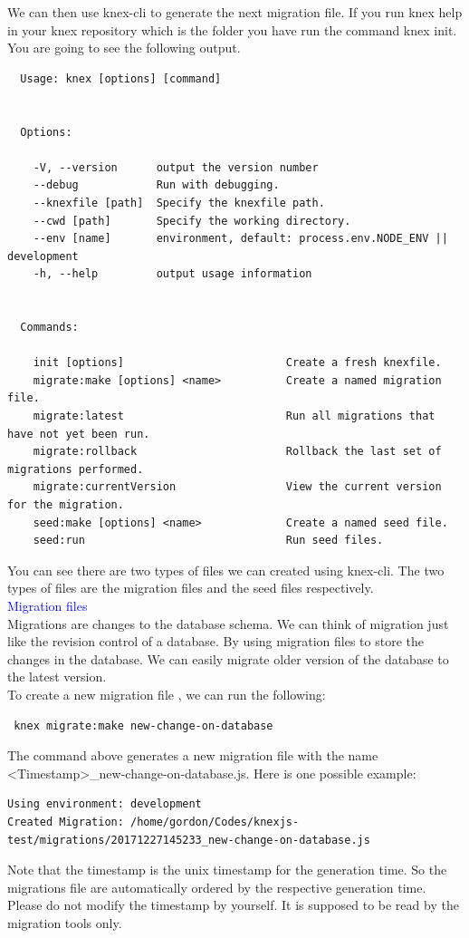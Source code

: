 \documentclass[a4paper]{article}
\begin{document}
We can then use knex-cli to generate the next migration file. If you run knex help in your knex repository which is the folder you have run the command knex init. You are going to see the following output.
\begin{lstlisting}
  Usage: knex [options] [command]


  Options:

    -V, --version      output the version number
    --debug            Run with debugging.
    --knexfile [path]  Specify the knexfile path.
    --cwd [path]       Specify the working directory.
    --env [name]       environment, default: process.env.NODE_ENV || development
    -h, --help         output usage information


  Commands:

    init [options]                         Create a fresh knexfile.
    migrate:make [options] <name>          Create a named migration file.
    migrate:latest                         Run all migrations that have not yet been run.
    migrate:rollback                       Rollback the last set of migrations performed.
    migrate:currentVersion                 View the current version for the migration.
    seed:make [options] <name>             Create a named seed file.
    seed:run                               Run seed files.
\end{lstlisting}

You can see there are two types of files we can created using knex-cli. The two types of files are the migration files and the seed files respectively.\\

\textcolor{blue}{Migration files}\\

Migrations are changes to the database schema. We can think of migration just like the revision control of a database. By using migration files to store the changes in the database. We can easily migrate older version of the database to the latest version.\\

To create a new migration file , we can run the following:
\begin{lstlisting}
 knex migrate:make new-change-on-database
\end{lstlisting}
The command above generates a new migration file with the name <Timestamp>\_new-change-on-database.js. Here is one possible example:
\begin{lstlisting}
Using environment: development
Created Migration: /home/gordon/Codes/knexjs-test/migrations/20171227145233_new-change-on-database.js
\end{lstlisting}
Note that the timestamp is the unix timestamp for the generation time. So the migrations file are automatically ordered by the respective generation time. Please do not modify the timestamp by yourself. It is supposed to be read by the migration tools only.\\
\end{document}

